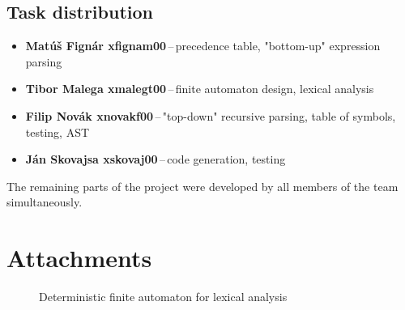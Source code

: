 \documentclass[a4paper, 11pt]{article}
\begin{document}
\subsection{Task distribution}\label{sec:TASKS}
\begin{itemize}

    \item \textbf{Matúš Fignár xfignam00}\,--\,precedence table, "bottom-up" expression parsing
    \item \textbf{Tibor Malega xmalegt00}\,--\,finite automaton design, lexical analysis
    \item \textbf{Filip Novák xnovakf00}\,--\,"top-down" recursive parsing, table of symbols, testing, AST
    \item \textbf{Ján Skovajsa xskovaj00}\,--\,code generation, testing

\end{itemize}
The remaining parts of the project were developed by all members of the team simultaneously.














\newpage
\section{Attachments}
\begin{figure}[ht]
    \begin{center}
        \caption{Deterministic finite automaton for lexical analysis}
        \label{automaton}
    \end{center}
\end{figure}
\end{document}
